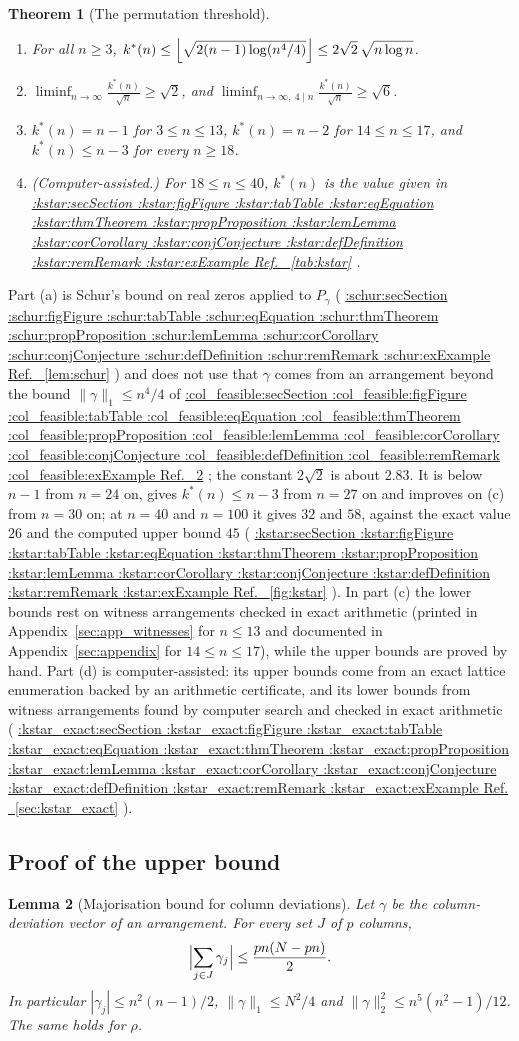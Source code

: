 \documentclass[11pt,a4paper]{article}
\makeatletter
\def\Cref@getprefix#1:#2\relax{#1}
\def\Cref@prefix@sec{sec}
\def\Cref@prefix@fig{fig}
\def\Cref@prefix@tab{tab}
\def\Cref@prefix@eq{eq}
\def\Cref@prefix@thm{thm}
\def\Cref@prefix@prop{prop}
\def\Cref@prefix@lem{lem}
\def\Cref@prefix@cor{cor}
\def\Cref@prefix@conj{conj}
\def\Cref@prefix@def{def}
\def\Cref@prefix@rem{rem}
\def\Cref@prefix@ex{ex}
\def\Cref@type@cap#1{%
  \edef\Cref@tmp{#1}%
  \ifx\Cref@tmp\Cref@prefix@sec Section%
  \else\ifx\Cref@tmp\Cref@prefix@fig Figure%
  \else\ifx\Cref@tmp\Cref@prefix@tab Table%
  \else\ifx\Cref@tmp\Cref@prefix@eq Equation%
  \else\ifx\Cref@tmp\Cref@prefix@thm Theorem%
  \else\ifx\Cref@tmp\Cref@prefix@prop Proposition%
  \else\ifx\Cref@tmp\Cref@prefix@lem Lemma%
  \else\ifx\Cref@tmp\Cref@prefix@cor Corollary%
  \else\ifx\Cref@tmp\Cref@prefix@conj Conjecture%
  \else\ifx\Cref@tmp\Cref@prefix@def Definition%
  \else\ifx\Cref@tmp\Cref@prefix@rem Remark%
  \else\ifx\Cref@tmp\Cref@prefix@ex Example%
  \else Ref.%
  \fi\fi\fi\fi\fi\fi\fi\fi\fi\fi\fi\fi
}
\DeclareRobustCommand{\Cref}[1]{%
  \begingroup
  \edef\Cref@label{#1}%
  \edef\Cref@prefix{\expandafter\Cref@getprefix\Cref@label:\relax}%
  \hyperref[#1]{\Cref@type@cap{\Cref@prefix}~\ref*{#1}}%
  \endgroup
}
\theoremstyle{plain}
\newtheorem{theorem}{Theorem}[section]
\newtheorem{lemma}[theorem]{Lemma}
\theoremstyle{definition}
\theoremstyle{remark}
\makeatother
\begin{document}
\begin{theorem}[The permutation threshold]
\label{thm:perm_threshold}
\leavevmode
\begin{enumerate}
\item[(a)] For all $n\ge3$, $\displaystyle k^{*}(n)\le\Bigl\lfloor\sqrt{2(n-1)\log(n^{4}/4)}\Bigr\rfloor\le 2\sqrt2\,\sqrt{n\log n}$.
\item[(b)] $\displaystyle\liminf_{n\to\infty}\frac{k^{*}(n)}{\sqrt n}\ge\sqrt2$, and $\displaystyle\liminf_{n\to\infty,\ 4\mid n}\frac{k^{*}(n)}{\sqrt n}\ge\sqrt6$.
\item[(c)] $k^{*}(n)=n-1$ for $3\le n\le13$, $k^{*}(n)=n-2$ for $14\le n\le17$, and $k^{*}(n)\le n-3$ for every $n\ge18$.
\item[(d)] \textup{(Computer-assisted.)} For $18\le n\le40$, $k^*(n)$ is the value given in \Cref{tab:kstar}.
\end{enumerate}
\end{theorem}

Part (a) is Schur's bound on real zeros applied to $P_\gamma$ (\Cref{lem:schur}) and does not use that $\gamma$ comes from an arrangement beyond the bound $\|\gamma\|_1\le n^4/4$ of \Cref{lem:col_feasible}; the constant $2\sqrt2$ is about $2.83$.
It is below $n-1$ from $n=24$ on, gives $k^*(n)\le n-3$ from $n=27$ on and improves on (c) from $n=30$ on; at $n=40$ and $n=100$ it gives $32$ and $58$, against the exact value $26$ and the computed upper bound $45$ (\Cref{fig:kstar}).
In part (c) the lower bounds rest on witness arrangements checked in exact arithmetic (printed in Appendix~\ref{sec:app_witnesses} for $n\le13$ and documented in Appendix~\ref{sec:appendix} for $14\le n\le17$), while the upper bounds are proved by hand.
Part (d) is computer-assisted: its upper bounds come from an exact lattice enumeration backed by an arithmetic certificate, and its lower bounds from witness arrangements found by computer search and checked in exact arithmetic (\Cref{sec:kstar_exact}).

\subsection{Proof of the upper bound}
\label{sec:kstar_upper}

\begin{lemma}[Majorisation bound for column deviations]
\label{lem:col_feasible}
Let $\gamma$ be the column-deviation vector of an arrangement.  For every set $J$ of $p$ columns,
\begin{equation}
\Bigl|\sum_{j\in J}\gamma_j\Bigr|\le \frac{pn(N-pn)}{2}.
\label{eq:col_feasible}
\end{equation}
In particular $|\gamma_j|\le n^{2}(n-1)/2$, $\|\gamma\|_1\le N^{2}/4$ and $\|\gamma\|_2^2\le n^5(n^2-1)/12$.  The same holds for $\rho$.
\end{lemma}
\end{document}
